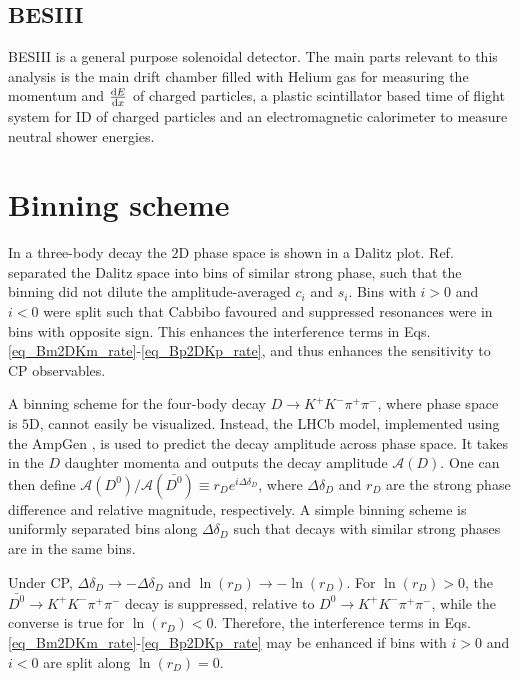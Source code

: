 \documentclass[12pt, a4paper, notitlepage, onecolumn]{article}
\numberwithin{equation}{section}
\begin{document}
\subsection{BESIII}
\noindent BESIII \cite{cite_BESIII} is a general purpose solenoidal detector. The main parts relevant to this analysis is the main drift chamber filled with Helium gas for measuring the momentum and $\dv{E}{x}$ of charged particles, a plastic scintillator based time of flight system for ID of charged particles and an electromagnetic calorimeter to measure neutral shower energies.

\section{Binning scheme}
\label{section_binning_scheme}
\noindent In a three-body decay the $2$D phase space is shown in a Dalitz plot. Ref. \cite{cite_LHCbGGSZKSpipi} separated the Dalitz space into bins of similar strong phase, such that the binning did not dilute the amplitude-averaged $c_i$ and $s_i$. Bins with $i > 0$ and $i < 0$ were split such that Cabbibo favoured and suppressed resonances were in bins with opposite sign. This enhances the interference terms in Eqs. \eqref{eq_Bm2DKm_rate}-\eqref{eq_Bp2DKp_rate}, and thus enhances the sensitivity to CP observables.

A binning scheme for the four-body decay $D\to K^+K^-\pi^+\pi^-$, where phase space is $5$D, cannot easily be visualized. Instead, the LHCb model, implemented using the AmpGen \cite{cite_AmpGen}, is used to predict the decay amplitude across phase space. It takes in the $D$ daughter momenta and outputs the decay amplitude $\mathcal{A}(D)$. One can then define $\mathcal{A}(D^0)/\mathcal{A}(\bar{D^0})\equiv r_De^{i\Delta\delta_D}$, where $\Delta\delta_D$ and $r_D$ are the strong phase difference and relative magnitude, respectively. A simple binning scheme is uniformly separated bins along $\Delta\delta_D$ such that decays with similar strong phases are in the same bins.

Under CP, $\Delta\delta_D\to -\Delta\delta_D$ and $\ln(r_D)\to -\ln(r_D)$. For $\ln(r_D) > 0$, the $\bar{D^0}\to K^+K^-\pi^+\pi^-$ decay is suppressed, relative to $D^0\to K^+K^-\pi^+\pi^-$, while the converse is true for $\ln(r_D) < 0$. Therefore, the interference terms in Eqs. \eqref{eq_Bm2DKm_rate}-\eqref{eq_Bp2DKp_rate} may be enhanced if bins with $i > 0$ and $i < 0$ are split along $\ln(r_D) = 0$.
\end{document}
